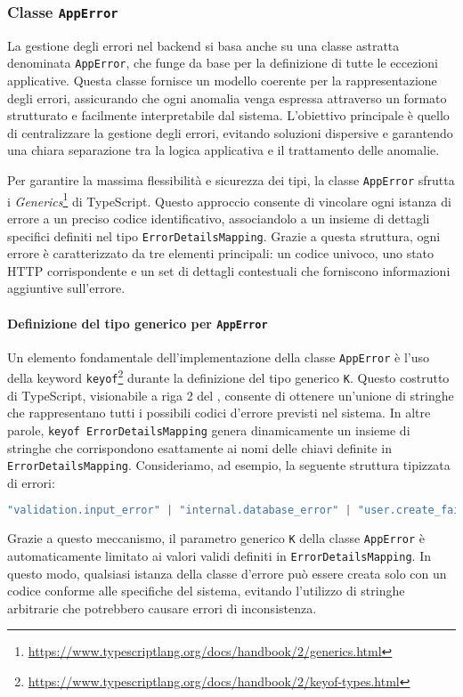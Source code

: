 \subsubsection{Classe \texttt{AppError}}
La gestione degli errori nel backend si basa anche su una classe astratta denominata \texttt{AppError}, che funge da base per la definizione di tutte le eccezioni applicative. Questa classe fornisce un modello coerente per la rappresentazione degli errori, assicurando che ogni anomalia venga espressa attraverso un formato strutturato e facilmente interpretabile dal sistema. L'obiettivo principale è quello di centralizzare la gestione degli errori, evitando soluzioni dispersive e garantendo una chiara separazione tra la logica applicativa e il trattamento delle anomalie.

Per garantire la massima flessibilità e sicurezza dei tipi, la classe \texttt{AppError} sfrutta i \textit{Generics}\footnote{\url{https://www.typescriptlang.org/docs/handbook/2/generics.html}} di TypeScript. Questo approccio consente di vincolare ogni istanza di errore a un preciso codice identificativo, associandolo a un insieme di dettagli specifici definiti nel tipo \texttt{ErrorDetailsMapping}. Grazie a questa struttura, ogni errore è caratterizzato da tre elementi principali: un codice univoco, uno stato HTTP corrispondente e un set di dettagli contestuali che forniscono informazioni aggiuntive sull'errore.



\paragraph{Definizione del tipo generico per \texttt{AppError}}
Un elemento fondamentale dell'implementazione della classe \texttt{AppError} è l'uso della keyword \texttt{keyof}\footnote{\url{https://www.typescriptlang.org/docs/handbook/2/keyof-types.html}} durante la definizione del tipo generico \texttt{K}. Questo costrutto di TypeScript, visionabile a riga 2 del , consente di ottenere un'unione di stringhe che rappresentano tutti i possibili codici d'errore previsti nel sistema. In altre parole, \texttt{keyof ErrorDetailsMapping} genera dinamicamente un insieme di stringhe che corrispondono esattamente ai nomi delle chiavi definite in \texttt{ErrorDetailsMapping}.
%
Consideriamo, ad esempio, la seguente struttura tipizzata di errori:
\begin{lstlisting}[language=typescript, caption={Esempio di unione di stringhe generate da \texttt{keyof}}]
  "validation.input_error" | "internal.database_error" | "user.create_failed"
\end{lstlisting}
%
Grazie a questo meccanismo, il parametro generico \texttt{K} della classe \texttt{AppError} è automaticamente limitato ai valori validi definiti in \texttt{ErrorDetailsMapping}. In questo modo, qualsiasi istanza della classe d'errore può essere creata solo con un codice conforme alle specifiche del sistema, evitando l'utilizzo di stringhe arbitrarie che potrebbero causare errori di inconsistenza.

